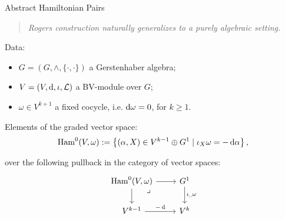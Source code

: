 \documentclass[beamer,10pt,handout]{standalone}  \Handouttrue
\begin{document}
\checkpoint

\begin{frame}[fragile]{Abstract Hamiltonian Pairs}
  \begin{quote}
    \emph{Rogers construction naturally generalizes to a purely algebraic setting.}
  \end{quote}
  \vfill\pause

  Data:
  \begin{itemize}
    \item $G = (G,\wedge,\lbrace \cdot, \cdot \rbrace)$ a Gerstenhaber algebra;
    \item $V = (V,\mathop{}\!\mathrm{d},\iota,\mathcal{L})$ a BV-module over $G$;
    \item $\omega \in V^{k{+}1}$ a fixed cocycle, i.e. $\mathop{}\!\mathrm{d} \omega = 0$, for $k\geq 1$.
  \end{itemize}
  \vfill\pause

  \begin{defblock}
    Elements of the graded vector space:
	  $$
		\mathrm{Ham}^0(V, \omega) := \left\{ (\alpha, X) \in V^{k-1} \oplus G^1 \mid \iota_X \omega = -\mathop{}\!\mathrm{d}\alpha \right\},
    $$
  \end{defblock}
  \vfill\pause

  \begin{remblock}
     over the following pullback in the category of vector spaces:
	\begin{displaymath}
		\begin{tikzcd}
			\Ham^0(V, \omega) \arrow[r] \arrow[d] \ar[dr,"\lrcorner",very near start,phantom]& G^1 \ar[d,"\iota_{\blank}\omega"] \\
			V^{k-1} \arrow[r, "-\d"] & V^{k}
		\end{tikzcd}
	\end{displaymath}
  \end{remblock}
\end{frame}
\end{document}
